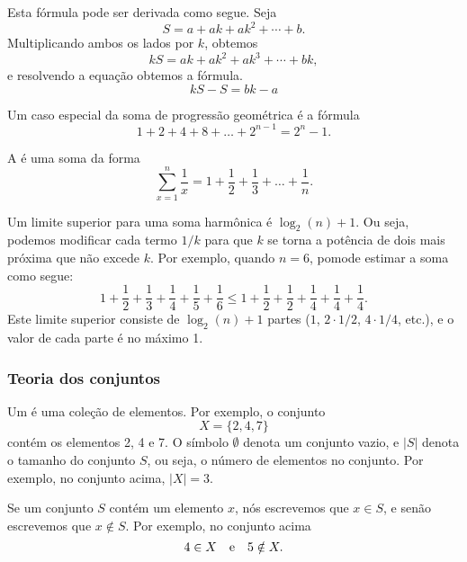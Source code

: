 Esta fórmula pode ser derivada como segue. Seja
\[ S = a + ak + ak^2 + \cdots + b .\]
Multiplicando ambos os lados por $k$, obtemos
\[ kS = ak + ak^2 + ak^3 + \cdots + bk,\]
e resolvendo a equação obtemos a fórmula.
\[ kS-S = bk-a\]

Um caso especial da soma de progressão geométrica é a fórmula
\[1+2+4+8+\ldots+2^{n-1}=2^n-1.\]


A  é uma soma da forma
\[ \sum_{x=1}^n \frac{1}{x} = 1+\frac{1}{2}+\frac{1}{3}+\ldots+\frac{1}{n}.\]

Um limite superior para uma soma harmônica é $\log_2(n)+1$.
Ou seja, podemos modificar cada termo $1/k$ para que $k$ se torna
a potência de dois mais próxima que não excede $k$.
Por exemplo, quando $n=6$, pomode estimar a soma como segue:
\[ 1+\frac{1}{2}+\frac{1}{3}+\frac{1}{4}+\frac{1}{5}+\frac{1}{6} \le
1+\frac{1}{2}+\frac{1}{2}+\frac{1}{4}+\frac{1}{4}+\frac{1}{4}.\]
Este limite superior consiste de $\log_2(n)+1$ partes
($1$, $2 \cdot 1/2$, $4 \cdot 1/4$, etc.),
e o valor de cada parte é no máximo 1.

\subsubsection{Teoria dos conjuntos}


Um  é uma coleção de elementos.
Por exemplo, o conjunto
\[X=\{2,4,7\}\]
contém os elementos 2, 4 e 7.
O símbolo $\emptyset$ denota um conjunto vazio,
e $|S|$ denota o tamanho do conjunto $S$,
ou seja, o número de elementos no conjunto.
Por exemplo, no conjunto acima, $|X|=3$.

Se um conjunto $S$ contém um elemento $x$,
nós escrevemos que $x \in S$,
e senão escrevemos que $x \notin S$.
Por exemplo, no conjunto acima
\[4 \in X \hspace{10px}\textrm{e}\hspace{10px} 5 \notin X.\]


